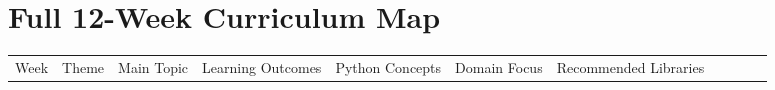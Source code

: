 \documentclass[
  a4paper,
]{article}
\newcounter{none} %
\begin{document}
\section{Full 12-Week Curriculum Map}\label{full-12-week-curriculum-map}

\clearpage
\begin{landscape}
\begingroup
\scriptsize
\setlength{\tabcolsep}{2pt}
\renewcommand{\arraystretch}{0.92}

{\def\LTcaptype{none} %
\begin{longtable}[]{@{}
  >{\raggedleft\arraybackslash}p{}
  >{\raggedright\arraybackslash}p{}
  >{\raggedright\arraybackslash}p{}
  >{\raggedright\arraybackslash}p{}
  >{\raggedright\arraybackslash}p{}
  >{\raggedright\arraybackslash}p{}
  >{\raggedright\arraybackslash}p{}
  >{\raggedright\arraybackslash}p{}
  >{\raggedright\arraybackslash}p{}
  >{\raggedright\arraybackslash}p{}
  >{\raggedright\arraybackslash}p{}@{}}
\toprule\noalign{}
\begin{minipage}[b]{\linewidth}\raggedleft
Week
\end{minipage} & \begin{minipage}[b]{\linewidth}\raggedright
Theme
\end{minipage} & \begin{minipage}[b]{\linewidth}\raggedright
Main Topic
\end{minipage} & \begin{minipage}[b]{\linewidth}\raggedright
Learning Outcomes
\end{minipage} & \begin{minipage}[b]{\linewidth}\raggedright
Python Concepts
\end{minipage} & \begin{minipage}[b]{\linewidth}\raggedright
Domain Focus
\end{minipage} & \begin{minipage}[b]{\linewidth}\raggedright
Recommended Libraries
\end{minipage} & \begin{minipage}[b]{\linewidth}\raggedright

\end{minipage}
\end{longtable}}
\end{landscape}
\end{document}

